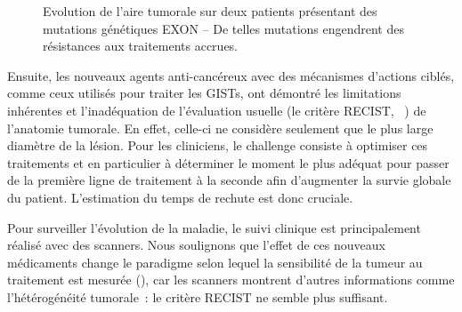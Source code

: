 \documentclass[main.tex]{subfiles}
\begin{document}
\begin{figure}
\hfill
{}
\caption{\label{fig:patients_EXON}Evolution de l'aire tumorale sur deux patients présentant des mutations génétiques EXON -- De telles mutations engendrent des résistances aux traitements accrues.}
\end{figure}

Ensuite, les nouveaux agents anti-cancéreux avec des mécanismes d'actions ciblés, comme ceux utilisés pour traiter les GISTs, ont démontré les limitations inhérentes et l'inadéquation de  l'évaluation usuelle (\ie le critère RECIST, \cf~\cite{suzuki2008}) de l'anatomie tumorale. En effet, celle-ci ne considère seulement que le plus large diamètre de la lésion. 
Pour les cliniciens, le challenge consiste à optimiser ces traitements et en particulier à déterminer le moment le plus adéquat pour passer de la première ligne de traitement à la seconde afin d'augmenter la survie globale du patient. L'estimation du temps de rechute est donc cruciale.


Pour surveiller l'évolution de la maladie, le suivi clinique est principalement réalisé avec des scanners. 
Nous soulignons que l'effet de ces nouveaux médicaments change le paradigme selon lequel la sensibilité de la tumeur au traitement est mesurée (\cf \cite{schramm2013}), car les scanners montrent d'autres informations comme l'hétérogénéité tumorale~: le critère RECIST ne semble plus suffisant.
\end{document}
